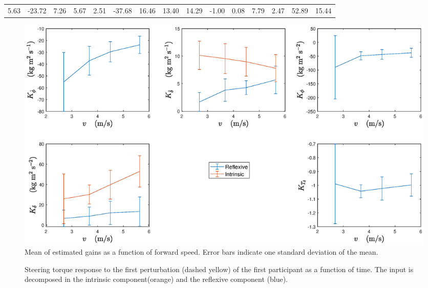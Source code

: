 \begin{table}[]
{\begin{tabular}{lllllllllllllll}
        \multicolumn{1}{l|}{5.63} & -23.72                         & 7.26                            & 5.67                           & 2.51                              & -37.68                       & 16.46                         & 13.40                           & 14.29                              & -1.00                 & 0.08                    & 7.79                              & 2.47                                 & 52.89                           & 15.44                             
        \end{tabular}%
        }
        \label{tb:steer_gains}
        \end{table}
\begin{figure}[h!]
    \centering
 
    \includegraphics[width=\linewidth]{images/steer_irf/param_gains_plot.eps}
    \caption{Mean of estimated gains as a function of forward speed. Error bars indicate one standard deviation of the mean.}
    \label{fig:gain_plots_steer}
\end{figure}
 
\begin{figure}[h!]
    \centering
 
    \caption{Steering torque response to the first perturbation (dashed yellow) of the first participant as a function of time. The input is decomposed in the intrinsic component(orange) and the reflexive component (blue). }
    \label{fig:param_input}
\end{figure}
